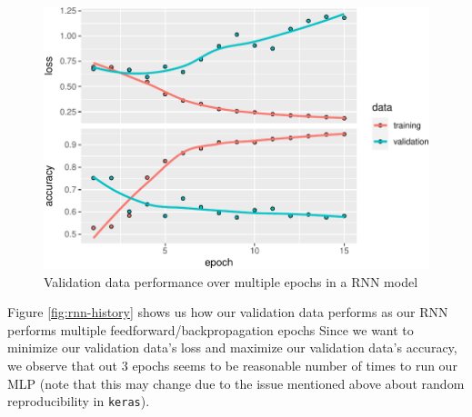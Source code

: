\documentclass[12pt]{article}
\begin{document}
\begin{figure}[H]
\includegraphics{report_files/figure-latex/unnamed-chunk-29-1} \caption{\label{fig:rnn-history}Validation data performance over multiple epochs in a RNN model}\label{fig:unnamed-chunk-29}
\end{figure}

Figure \ref{fig:rnn-history} shows us how our validation data performs
as our RNN performs multiple feedforward/backpropagation epochs Since we
want to minimize our validation data's loss and maximize our validation
data's accuracy, we observe that out \(3\) epochs seems to be reasonable
number of times to run our MLP (note that this may change due to the
issue mentioned above about random reproducibility in \texttt{keras}).
\end{document}
